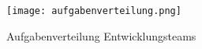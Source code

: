 \begin{figure}[h]
    \begin{center}
        \texttt{[image: aufgabenverteilung.png]}
        \caption[Aufgabenverteilung Entwicklungsteams (Abbildungsverzeichnis)]{Aufgabenverteilung Entwicklungsteams
        }
        \label{fig:aufgabenverteilung}
    \end{center}
\end{figure}